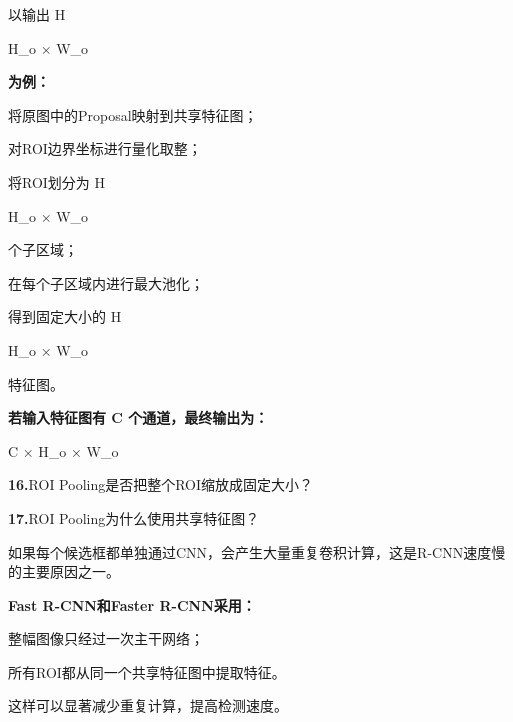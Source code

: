 \documentclass[UTF8,openany,oneside,zihao=-4,fontset=windows]{ctexbook}
\newif\ifshowsolutions
\newcommand{\Question}[2]{%
  \par\Needspace{4\baselineskip}\medskip
  \noindent\textbf{\color{MVBlue}#1}\quad #2\par
}
\newenvironment{AnswerBox}{\begin{tcolorbox}[breakable,colback=MVLight,colframe=MVBlue!45,title={参考答案},fonttitle=\bfseries,boxrule=0.55pt,arc=1.5mm,left=2mm,right=2mm,top=1.5mm,bottom=1.5mm]}{\end{tcolorbox}}
\newcommand{\PracticeSpace}[1]{\ifshowsolutions\else\par\vspace{#1}\par\fi}
\begin{document}
\begin{AnswerBox}
\par 以输出 H
\begin{center}\small\ttfamily H\_o × W\_o\end{center}
\par\noindent\textbf{为例：}
\par\noindent\textbullet\quad 将原图中的Proposal映射到共享特征图；
\par\noindent\textbullet\quad 对ROI边界坐标进行量化取整；
\par 将ROI划分为 H
\begin{center}\small\ttfamily H\_o × W\_o\end{center}
\par\noindent\textbullet\quad 个子区域；
\par\noindent\textbullet\quad 在每个子区域内进行最大池化；
\par 得到固定大小的 H
\begin{center}\small\ttfamily H\_o × W\_o\end{center}
\par 特征图。
\par\noindent\textbf{若输入特征图有 C 个通道，最终输出为：}
\begin{center}\small\ttfamily C × H\_o × W\_o\end{center}
\end{AnswerBox}
\else
\PracticeSpace{2.4cm}
\fi
\Question{16.}{ROI Pooling是否把整个ROI缩放成固定大小？}
\ifshowsolutions
\begin{AnswerBox}
\par 从效果上看，它把不同大小的ROI转换为固定大小特征，但实现时不是简单地直接缩放图像。
\par\noindent\textbf{ROI Pooling通常是：}
\par\noindent\textbullet\quad 将ROI划分为固定数量的网格；
\par\noindent\textbullet\quad 每个网格内进行最大池化；
\par 每个网格产生一个输出值。
\par 因此，它本质上是分块最大池化。
\end{AnswerBox}
\else
\PracticeSpace{2.4cm}
\fi
\Question{17.}{ROI Pooling为什么使用共享特征图？}
\ifshowsolutions
\begin{AnswerBox}
\par 如果每个候选框都单独通过CNN，会产生大量重复卷积计算，这是R-CNN速度慢的主要原因之一。
\par\noindent\textbf{Fast R-CNN和Faster R-CNN采用：}
\par\noindent\textbullet\quad 整幅图像只经过一次主干网络；
\par 所有ROI都从同一个共享特征图中提取特征。
\par 这样可以显著减少重复计算，提高检测速度。
\end{AnswerBox}
\end{document}
